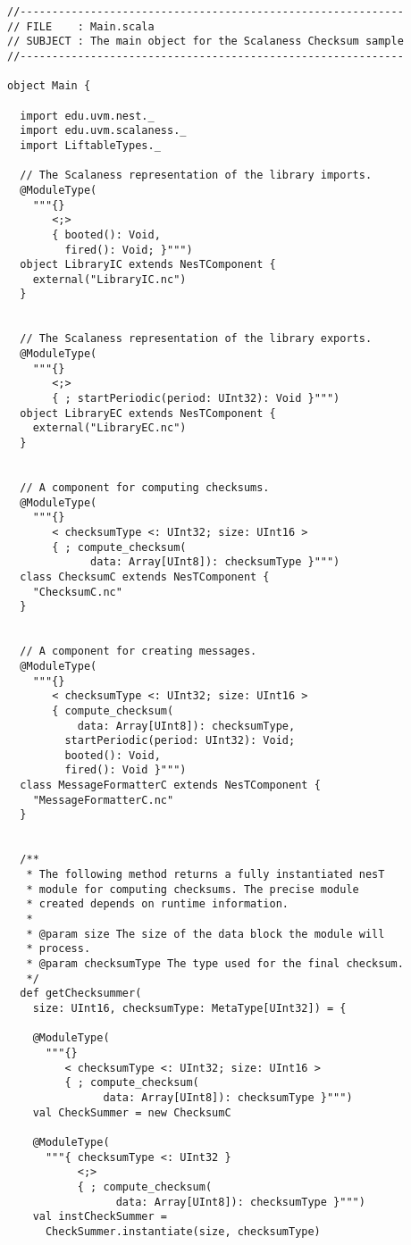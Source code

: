 \singlespace
\vspace{1.0ex}
\begin{lstlisting}[language=scalaness]
//------------------------------------------------------------
// FILE    : Main.scala
// SUBJECT : The main object for the Scalaness Checksum sample
//------------------------------------------------------------

object Main {

  import edu.uvm.nest._
  import edu.uvm.scalaness._
  import LiftableTypes._ 

  // The Scalaness representation of the library imports.
  @ModuleType(
    """{}
       <;>
       { booted(): Void,
         fired(): Void; }""")
  object LibraryIC extends NesTComponent {
    external("LibraryIC.nc")
  }


  // The Scalaness representation of the library exports.
  @ModuleType(
    """{}
       <;>
       { ; startPeriodic(period: UInt32): Void }""")
  object LibraryEC extends NesTComponent {
    external("LibraryEC.nc")
  }


  // A component for computing checksums.
  @ModuleType(
    """{}
       < checksumType <: UInt32; size: UInt16 >
       { ; compute_checksum(
             data: Array[UInt8]): checksumType }""")
  class ChecksumC extends NesTComponent {
    "ChecksumC.nc"
  }
 

  // A component for creating messages.
  @ModuleType(
    """{}
       < checksumType <: UInt32; size: UInt16 >
       { compute_checksum(
           data: Array[UInt8]): checksumType,
         startPeriodic(period: UInt32): Void;
         booted(): Void,
         fired(): Void }""")
  class MessageFormatterC extends NesTComponent {
    "MessageFormatterC.nc"
  }


  /**
   * The following method returns a fully instantiated nesT
   * module for computing checksums. The precise module
   * created depends on runtime information.
   *
   * @param size The size of the data block the module will
   * process.
   * @param checksumType The type used for the final checksum.
   */
  def getChecksummer(
    size: UInt16, checksumType: MetaType[UInt32]) = {
  
    @ModuleType(
      """{}
         < checksumType <: UInt32; size: UInt16 >
         { ; compute_checksum(
               data: Array[UInt8]): checksumType }""")
    val CheckSummer = new ChecksumC
    
    @ModuleType(
      """{ checksumType <: UInt32 }
           <;>
           { ; compute_checksum(
                 data: Array[UInt8]): checksumType }""")
    val instCheckSummer =
      CheckSummer.instantiate(size, checksumType)
    

\end{lstlisting}
